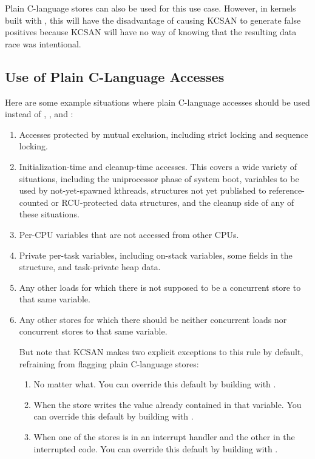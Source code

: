 Plain C-language stores can also be used for this use case.
However, in kernels built with ,
this will have the disadvantage of causing KCSAN to generate false positives
because KCSAN will have no way of knowing that the resulting data race
was intentional.


\subsection{Use of Plain C-Language Accesses}

Here are some example situations where plain C-language accesses should be
used instead of , , and :

\begin{enumerate}
\item	Accesses protected by mutual exclusion, including strict locking
	and sequence locking.

\item	Initialization-time and cleanup-time accesses.
	This covers a wide variety of situations, including the uniprocessor
	phase of system boot, variables to be used by not-yet-spawned kthreads,
	structures not yet published to reference-counted or RCU-protected
	data structures, and the cleanup side of any of these situations.

\item	Per-CPU variables that are not accessed from other CPUs.

\item	Private per-task variables, including on-stack variables, some
	fields in the  structure, and task-private heap data.

\item	Any other loads for which there is not supposed to be a concurrent
	store to that same variable.

\item	Any other stores for which there should be neither concurrent
	loads nor concurrent stores to that same variable.

	But note that KCSAN makes two explicit exceptions to this rule
	by default, refraining from flagging plain C-language stores:

	\begin{enumerate}
	\item	No matter what.
		You can override this default by building
		with .

	\item	When the store writes the value already contained in
		that variable.
		You can override this default by building with
		.

	\item	When one of the stores is in an interrupt handler and
		the other in the interrupted code.
		You can override this default by building with
		.
	\end{enumerate}
\end{enumerate}

